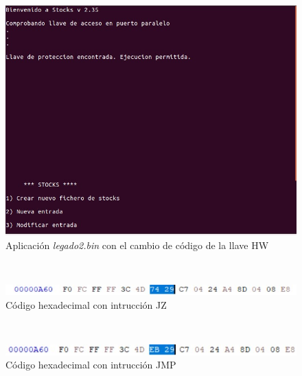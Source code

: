 \documentclass{article}
\begin{document}
\begin{figure}[h!]
    \centering
    \includegraphics[scale=0.9]{images/appLegado2.jpg}
    \caption{Aplicación \textit{legado2.bin} con el cambio de código de la llave HW}
    \label{fig:leg2}
\end{figure}\\

\begin{figure}[h!]
    \centering
    \includegraphics[scale=0.9]{images/hexaSinMod.jpg}
    \caption{Código hexadecimal con intrucción JZ}
    \label{fig:hexSinMod}
\end{figure}\\

\begin{figure}[h!]
    \centering
    \includegraphics[scale=0.9]{images/hexaMod.jpg}
    \caption{Código hexadecimal con intrucción JMP}
    \label{fig:hexMod}
\end{figure}\\
\end{document}
